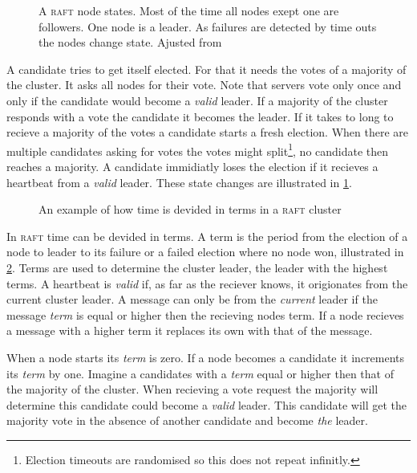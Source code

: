 \begin{figure}[htbp]
	\centering
	
	\caption{A \textsc{raft} node states. Most of the time all nodes exept one are followers. One node is a leader. As failures are detected by time outs the nodes change state. Ajusted from \cite{raft}}
	\label{fig:raft_states}
\end{figure}
%
A candidate tries to get itself elected. For that it needs the votes of a majority of the cluster. It asks all nodes for their vote. Note that servers vote only once and only if the candidate would become a \emph{valid} leader. If a majority of the cluster responds with a vote the candidate it becomes the leader. If it takes to long to recieve a majority of the votes a candidate starts a fresh election. When there are multiple candidates asking for votes the votes might split\footnote{Election timeouts are randomised so this does not repeat infinitly.}, no candidate then reaches a majority. A candidate immidiatly loses the election if it recieves a heartbeat from a \emph{valid} leader. These state changes are illustrated in \cref{fig:raft_states}.

\begin{figure}[htbp]
	\centering
	
	\caption{An example of how time is devided in terms in a \textsc{raft} cluster}
	\label{fig:raft_terms}
\end{figure}

In \textsc{raft} time can be devided in terms. A term is the period from the election of a node to leader to its failure or a failed election where no node won, illustrated in \cref{fig:raft_terms}. Terms are used to determine the cluster leader, the leader with the highest terms. A heartbeat is \emph{valid} if, as far as the reciever knows, it origionates from the current cluster leader. A message can only be from the \textit{current} leader if the message \textit{term} is equal or higher then the recieving nodes term. If a node recieves a message with a higher term it replaces its own with that of the message.

When a node starts its \textit{term} is zero. If a node becomes a candidate it increments its \textit{term} by one. Imagine a candidates with a \textit{term} equal or higher then that of the majority of the cluster. When recieving a vote request the majority will determine this candidate could become a \emph{valid} leader. This candidate will get the majority vote in the absence of another candidate and become \textit{the} leader.

